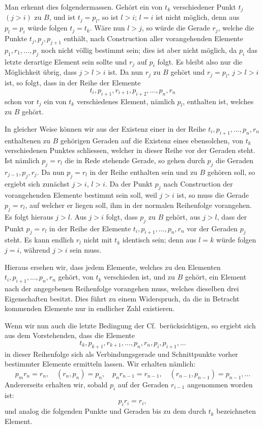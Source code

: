 \documentclass[11pt]{article}
\newcommand{\Cf}{\textup{Cf.}}
\begin{document}
Man erkennt dies folgendermassen. Gehört ein von $t_k$ verschiedener Punkt $t_j$ $(j>i)$ zu $B$, und ist $t_j=p_l$, so ist $l>i$; $l=i$ ist nicht möglich, denn aus $p_l=p_i$ würde folgen $t_j=t_k$. Wäre nun $l>j$, so würde die Gerade $r_j$, welche die Punkte $t_j,p_j,p_{j+1}$ enthält, nach Construction aller vorangehenden Elemente $p_1,r_1,\ldots,p_j$ noch nicht völlig bestimmt sein; dies ist aber nicht möglich, da $p_i$ das letzte derartige Element sein sollte und $r_j$ auf $p_i$ folgt. Es bleibt also nur die Möglichkeit übrig, dass $j>l>i$ ist. Da nun $r_j$ zu $B$ gehört und $r_j=p_l$, $j>l>i$ ist, so folgt, dass in der Reihe der Elemente
\[
t_i,p_{i+1},r_{i+1},p_{i+2},\ldots,p_n,r_n
\]
schon vor $t_j$ ein von $t_k$ verschiedenes Element, nämlich $p_l$, enthalten ist, welches zu $B$ gehört.

In gleicher Weise können wir aus der Existenz einer in der Reihe $t_i,p_{i+1},\ldots,p_n,r_n$ enthaltenen zu $B$ gehörigen Geraden auf die Existenz eines ebensolchen, von $t_k$ verschiedenen Punktes schliessen, welcher in dieser Reihe vor der Geraden steht. Ist nämlich $p_j=r_l$ die in Rede stehende Gerade, so gehen durch $p_j$ die Geraden $r_{j-1},p_j,r_j$. Da nun $p_j=r_l$ in der Reihe enthalten sein und zu $B$ gehören soll, so ergiebt sich zunächst $j>i$, $l>i$. Da der Punkt $p_j$ nach Construction der vorangehenden Elemente bestimmt sein soll, weil $j>i$ ist, so muss die Gerade $p_j=r_l$, auf welcher er liegen soll, ihm in der normalen Reihenfolge vorangehen. Es folgt hieraus $j>l$. Aus $j>i$ folgt, dass $p_j$ zu $B$ gehört, aus $j>l$, dass der Punkt $p_j=r_l$ in der Reihe der Elemente $t_i,p_{i+1},\ldots,p_n,r_n$ vor der Geraden $p_j$ steht. Es kann endlich $r_l$ nicht mit $t_k$ identisch sein; denn aus $l=k$ würde folgen $j=i$, während $j>i$ sein muss.

Hieraus ersehen wir, dass jedem Elemente, welches zu den Elementen $t_i,p_{i+1},\ldots,p_n,r_n$ gehört, von $t_k$ verschieden ist, und zu $B$ gehört, ein Element nach der angegebenen Reihenfolge vorangehen muss, welches dieselben drei Eigenschaften besitzt. Dies führt zu einem Widerspruch, da die in Betracht kommenden Elemente nur in endlicher Zahl existieren.

Wenn wir nun auch die letzte Bedingung der \Cf\ berücksichtigen, so ergiebt sich aus dem Vorstehenden, dass die Elemente
\[
t_k,p_{k+1},r_{k+1},\ldots,p_n,r_n,p_i,p_{i+1},\ldots
\]
in dieser Reihenfolge sich als Verbindungsgerade und Schnittpunkte vorher bestimmter Elemente ermitteln lassen. Wir erhalten nämlich:
\[
 p_m r_n=r_n,\quad (r_n,p_n)=p_n,\quad p_n r_{n-1}=r_{n-1},\quad (r_{n-1},p_{n-1})=p_{n-1},\ldots
\]
Andererseits erhalten wir, sobald $p_i$ auf der Geraden $r_{i-1}$ angenommen worden ist:
\[
p_i r_i=r_i,
\]
und analog die folgenden Punkte und Geraden bis zu dem durch $t_k$ bezeichneten Element.
\end{document}
